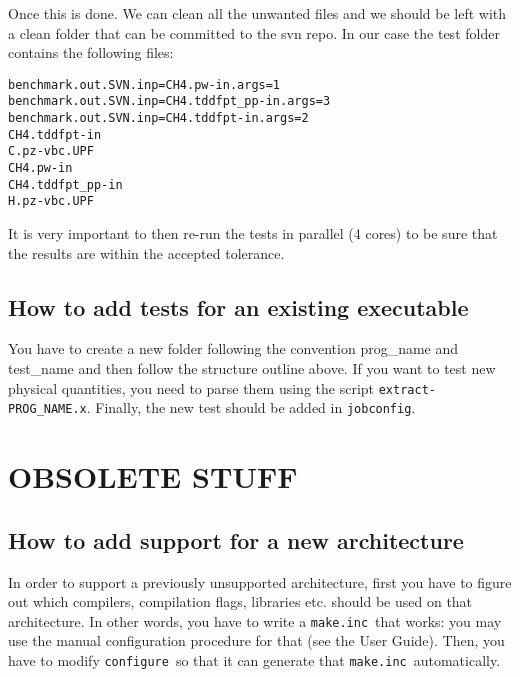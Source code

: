 \documentclass[12pt,a4paper]{article}
\def\configure{\texttt{configure}}
\def\make.inc{\texttt{make.inc}}
\begin{document}
\begin{description}
Once this is done. We can clean all the unwanted files and we should be left with a clean folder that can be committed to the svn repo. In our case the test folder contains the following files:
\begin{verbatim}
benchmark.out.SVN.inp=CH4.pw-in.args=1      
benchmark.out.SVN.inp=CH4.tddfpt_pp-in.args=3 
benchmark.out.SVN.inp=CH4.tddfpt-in.args=2 
CH4.tddfpt-in    
C.pz-vbc.UPF 
CH4.pw-in                                      
CH4.tddfpt_pp-in  
H.pz-vbc.UPF
\end{verbatim}

It is very important to then re-run the tests in parallel (4 cores) to be sure that the results are within the accepted tolerance. 

\end{description}


\subsection{How to add tests for an existing executable}

You have to create a new folder following the convention prog\_name and test\_name and then follow the structure outline above. 
If you want to test new physical quantities, you need to parse them using the script \texttt{extract-PROG\_NAME.x}. Finally, the new test should 
be added in \texttt{jobconfig}.


\section{OBSOLETE STUFF}

\subsection{How to add support for a new architecture}

In order to support a previously unsupported architecture, first you
have to figure out which compilers, compilation flags, libraries
etc. should be used on that architecture.
In other words, you have to write a \make.inc\ that works: you may use
the manual configuration procedure for that (see the
User Guide).  Then, you have to modify \configure\ so that it can
generate that \make.inc\ automatically.
\end{document}
